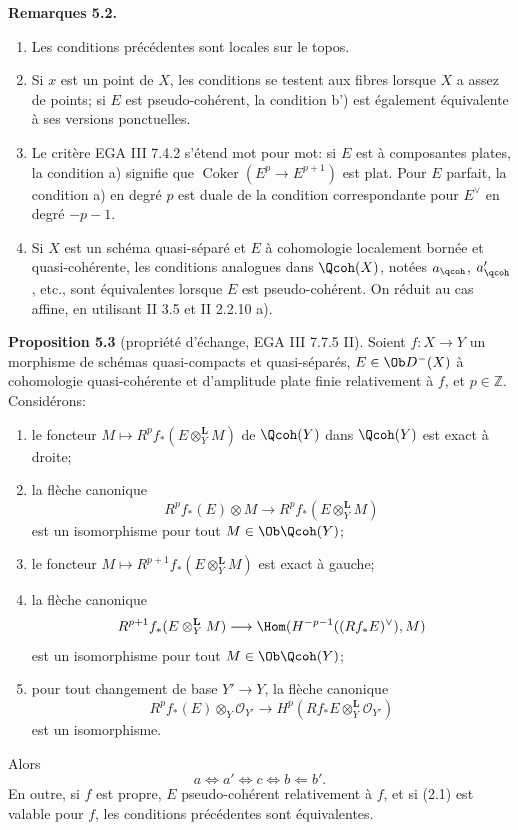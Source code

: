 \documentclass[11pt]{article}
\providecommand{\Coker}{\operatorname{Coker}}
\begin{document}
\textbf{Remarques 5.2.}
\begin{enumerate}[label=\roman*)]
\item Les conditions précédentes sont locales sur le topos.
\item Si \(x\) est un point de \(X\), les conditions se testent aux fibres lorsque \(X\) a assez de points; si \(E\) est pseudo-cohérent, la condition b') est également équivalente à ses versions ponctuelles.
\item Le critère EGA III 7.4.2 s'étend mot pour mot: si \(E\) est à composantes plates, la condition a) signifie que \(\Coker(E^p\to E^{p+1})\) est plat. Pour \(E\) parfait, la condition a) en degré \(p\) est duale de la condition correspondante pour \(E^{\vee}\) en degré \(-p-1\).
\item Si \(X\) est un schéma quasi-séparé et \(E\) à cohomologie localement bornée et quasi-cohérente, les conditions analogues dans \(\Qcoh(X)\), notées \(a_{\qcoh}\), \(a'_{\qcoh}\), etc., sont équivalentes lorsque \(E\) est pseudo-cohérent. On réduit au cas affine, en utilisant II 3.5 et II 2.2.10 a).
\end{enumerate}

\textbf{Proposition 5.3} (propriété d'échange, EGA III 7.7.5 II). Soient \(f:X\to Y\) un morphisme de schémas quasi-compacts et quasi-séparés, \(E\in\Ob D^{-}(X)\) à cohomologie quasi-cohérente et d'amplitude plate finie relativement à \(f\), et \(p\in\mathbb Z\). Considérons:
\begin{enumerate}[label=\alph*)]
\item le foncteur \(M\mapsto R^pf_*(E\otimes_Y^{\mathbf L}M)\) de \(\Qcoh(Y)\) dans \(\Qcoh(Y)\) est exact à droite;
\item[\(\mathrm a'\)] la flèche canonique
\[
 R^pf_*(E)\otimes M
 \longrightarrow
 R^pf_*(E\otimes_Y^{\mathbf L}M)
\]
est un isomorphisme pour tout \(M\in\Ob\Qcoh(Y)\);
\item[\(\mathrm b\)] le foncteur \(M\mapsto R^{p+1}f_*(E\otimes_Y^{\mathbf L}M)\) est exact à gauche;
\item[\(\mathrm b'\)] la flèche canonique
\[
 R^{p+1}f_*(E\otimes_Y^{\mathbf L}M)
 \longrightarrow
 \Hom(H^{-p-1}((Rf_*E)^{\vee}),M)
\]
est un isomorphisme pour tout \(M\in\Ob\Qcoh(Y)\);
\item[\(\mathrm c\)] pour tout changement de base \(Y'\to Y\), la flèche canonique
\[
 R^pf_*(E)\otimes_Y\mathcal O_{Y'}
 \longrightarrow
 H^p(Rf_*E\otimes_Y^{\mathbf L}\mathcal O_{Y'})
\]
est un isomorphisme.
\end{enumerate}
Alors
\[
 a\Longleftrightarrow a'\Longleftrightarrow c\Longleftrightarrow b\Longleftarrow b'.
\]
En outre, si \(f\) est propre, \(E\) pseudo-cohérent relativement à \(f\), et si (2.1) est valable pour \(f\), les conditions précédentes sont équivalentes.
\end{document}
